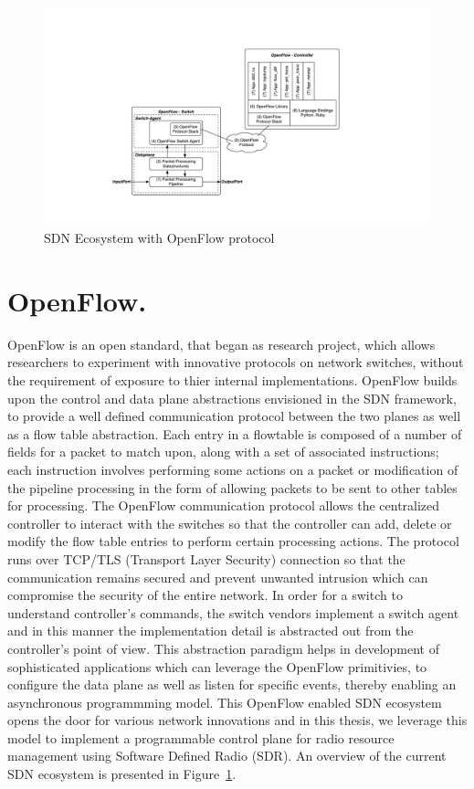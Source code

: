 \begin{figure}[t]
  \centering
  \includegraphics[width=1.5\textwidth]{figures/OpenFlow.pdf}
  \caption{SDN Ecosystem with OpenFlow protocol}
  \label{fig:OpenFlow}
\end{figure}
\section{OpenFlow.}
OpenFlow is an open standard, that began as research project, which allows researchers to experiment with innovative protocols on network switches, without the requirement of exposure to thier internal implementations. OpenFlow\cite{openflow} builds upon the control and data plane abstractions envisioned in the SDN framework, to provide a well defined communication protocol between the two planes as well as a flow table abstraction. Each entry in a flowtable is composed of a number of fields for a packet to match upon, along with a set of associated instructions; each instruction involves performing some actions on a packet or modification of the pipeline processing in the form of allowing packets to be sent to other tables for processing. The OpenFlow communication protocol allows the centralized controller to interact with the switches so that the controller can add, delete or modify the flow table entries to perform certain processing actions. The protocol runs over TCP/TLS (Transport Layer Security) connection so that the communication remains secured and prevent unwanted intrusion which can compromise the security of the entire network. In order for a switch to understand controller's commands, the switch vendors implement a switch agent and in this manner the implementation detail is abstracted out from the controller's point of view. This abstraction paradigm helps in development of sophisticated applications which can leverage the OpenFlow primitivies, to configure the data plane as well as listen for specific events, thereby enabling an asynchronous programmming model. This OpenFlow enabled SDN ecosystem opens the door for various network innovations and in this thesis, we leverage this model to implement a programmable control plane for radio resource management using Software Defined Radio (SDR). An overview of the current SDN ecosystem is presented in Figure~\ref{fig:OpenFlow}.     

